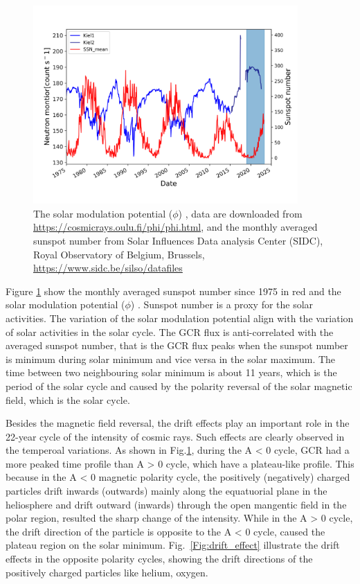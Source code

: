 \begin{figure}
	\centering
	\includegraphics[width = 0.9\textwidth]{images/Solar_modulation.png}
	\caption{The solar modulation potential ($\phi$) \cite{Usoskin 2011}, data are downloaded from \url{https://cosmicrays.oulu.fi/phi/phi.html}, and the monthly averaged sunspot number from Solar Influences Data analysis Center (SIDC), Royal Observatory of Belgium, Brussels, \url{https://www.sidc.be/silso/datafiles}}
	\label{Fig:Solar_modulation}
\end{figure}


Figure \ref{Fig:Solar_modulation} show the monthly averaged sunspot number since 1975 in red and the solar modulation potential ($\phi$) \cite{Usoskin 2011}.
Sunspot number is a proxy for the solar activities. The variation of the solar modulation potential align with the variation of solar activities in the solar cycle.
The GCR flux is anti-correlated with the averaged sunspot number, that is the GCR flux peaks when the sunspot number is minimum during solar minimum and vice versa in the solar maximum.
The time between two neighbouring solar minimum is about 11 years, which is the period of the solar cycle and caused by the polarity reversal of the solar magnetic field, which is the solar cycle.

Besides the magnetic field reversal, the drift effects play an important role in the 22-year cycle of the intensity of cosmic rays. Such effects are clearly observed in the temperoal variations.
As shown in Fig.\ref{Fig:Solar_modulation}, during the A < 0 cycle, GCR had a more peaked time profile than A > 0 cycle, which have a plateau-like profile. 
This because in the A < 0 magnetic polarity cycle, the positively (negatively) charged particles drift inwards (outwards) mainly along the equatuorial plane in the heliosphere and drift outward (inwards) through the open mangentic field in the polar region, resulted the sharp change of the intensity. While in the A > 0 cycle, the drift direction of the particle is opposite to the A < 0 cycle, caused the plateau region on the solar minimum. Fig.~\ref{Fig:drift_effect} illustrate the drift effects in the opposite polarity cycles, showing the drift directions of the positively charged particles like helium, oxygen.

